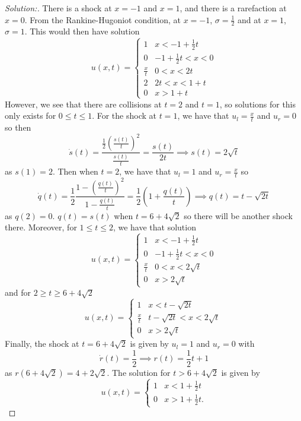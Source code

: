 \documentclass{article}
\begin{document}
    \begin{proof}[Solution:]
      There is a shock at $x=-1$ and $x=1$, and there is a rarefaction at $x=0$. From the Rankine-Hugoniot condition, at $x=-1$, $\sigma = \frac{1}{2}$ and at $x=1$, $\sigma = 1$.
      This would then have solution 
      \[u(x,t) = \begin{cases}
        1 &x<-1+\frac{1}{2}t \\
        0 &-1+\frac{1}{2}t < x < 0 \\
        \frac{x}{t} &0 < x < 2t \\
        2 &2t < x < 1+t \\
        0 &x > 1+t
      \end{cases}\]
      However, we see that there are collisions at $t=2$ and $t=1$, so solutions for this only exists for $0\le t \le 1$. For the shock at $t=1$, we have that $u_l = \frac{x}{t}$ and $u_r = 0$ so then 
      \[\dot{s}(t) = \frac{\frac{1}{2}\left(\frac{s(t)}{t}\right)^2}{\frac{s(t)}{t}} = \frac{s(t)}{2t} \implies s(t) = 2\sqrt{t}\]
      as $s(1) = 2$. Then when $t = 2$, we have that $u_l = 1$ and $u_r = \frac{x}{t}$ so 
      \[\dot{q}(t) = \frac{1}{2}\frac{1 - \left(\frac{q(t)}{t}\right)^2}{1-\frac{q(t)}{t}} = \frac{1}{2}(1+\frac{q(t)}{t})\implies q(t) = t - \sqrt{2t}\]
      as $q(2) = 0$. $q(t) = s(t)$ when $t = 6 +4\sqrt{2}$ so there will be another shock there. Moreover, for $1 \le t \le 2$, we have that solution 
      \[u(x,t) = \begin{cases}
        1 &x<-1+\frac{1}{2}t \\
        0 &-1+\frac{1}{2}t < x < 0 \\
        \frac{x}{t} &0 < x < 2\sqrt{t} \\
        0 &x > 2\sqrt{t}
      \end{cases}\]
      and for $2\ge t \ge 6+4\sqrt{2}$
      \[u(x,t) = \begin{cases}
        1 &x<t - \sqrt{2t}\\
        \frac{x}{t} &t - \sqrt{2t} < x < 2\sqrt{t} \\
        0 &x > 2\sqrt{t}
      \end{cases}\]
      Finally, the shock at $t = 6+4\sqrt{2}$ is given by $u_l = 1$ and $u_r=0$ with 
      \[\dot{r}(t) = \frac{1}{2} \implies r(t) = \frac{1}{2}t + 1\]
      as $r(6+4\sqrt{2}) = 4+2\sqrt{2}$. The solution for $t > 6+4\sqrt{2}$ is given by 
      \[u(x,t) = \begin{cases}
        1 &x<1 + \frac{1}{2}t\\
        0 &x > 1 + \frac{1}{2}t.

\end{cases}\]
\end{proof}
\end{document}

